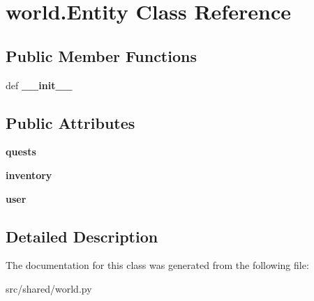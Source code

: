 \hypertarget{classworld_1_1_entity}{\section{world.\-Entity \-Class \-Reference}
\label{classworld_1_1_entity}
}
\subsection*{\-Public \-Member \-Functions}
\begin{DoxyCompactItemize}
\item 
\hypertarget{classworld_1_1_entity_ae3f6c9349b4756df29e482ae07582ca4}{def {\bfseries \-\_\-\-\_\-init\-\_\-\-\_\-}}\label{classworld_1_1_entity_ae3f6c9349b4756df29e482ae07582ca4}

\end{DoxyCompactItemize}
\subsection*{\-Public \-Attributes}
\begin{DoxyCompactItemize}
\item 
\hypertarget{classworld_1_1_entity_a02ac854a6a124cc8bfdef46ae7941434}{{\bfseries quests}}\label{classworld_1_1_entity_a02ac854a6a124cc8bfdef46ae7941434}

\item 
\hypertarget{classworld_1_1_entity_add2bc9bb2f731cc86228d8932a962e60}{{\bfseries inventory}}\label{classworld_1_1_entity_add2bc9bb2f731cc86228d8932a962e60}

\item 
\hypertarget{classworld_1_1_entity_a2e893d9acd136fa158874582882a3f13}{{\bfseries user}}\label{classworld_1_1_entity_a2e893d9acd136fa158874582882a3f13}

\end{DoxyCompactItemize}


\subsection{\-Detailed \-Description}
\begin{DoxyVerb}\end{DoxyVerb}
 

\-The documentation for this class was generated from the following file\-:\begin{DoxyCompactItemize}
\item 
src/shared/world.\-py\end{DoxyCompactItemize}
